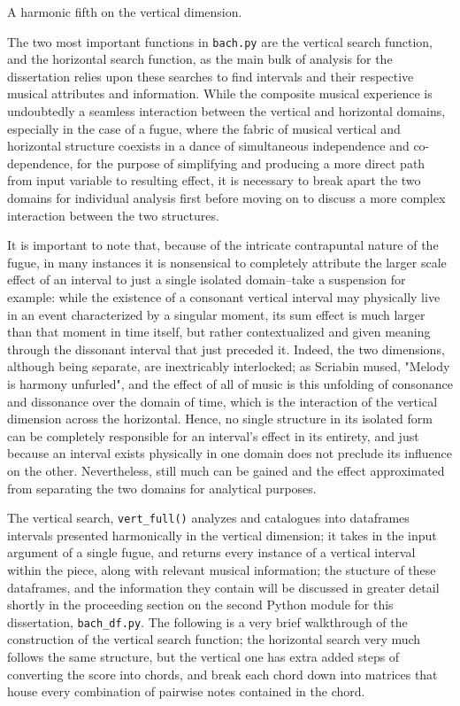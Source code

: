 \begin{Example}[H]
\vspace{1.5em}
    \centering
    \caption{ A harmonic fifth on the vertical dimension. }
\end{Example}    
    The two most important functions in \texttt{bach.py} are the vertical
search function, and the horizontal search function, as the main bulk of
analysis for the dissertation relies upon these searches to find
intervals and their respective musical attributes and information. While
the composite musical experience is undoubtedly a seamless interaction
between the vertical and horizontal domains, especially in the case of a
fugue, where the fabric of musical vertical and horizontal structure
coexists in a dance of simultaneous independence and co-dependence, for
the purpose of simplifying and producing a more direct path from input
variable to resulting effect, it is necessary to break apart the two
domains for individual analysis first before moving on to discuss a more
complex interaction between the two structures.

It is important to note that, because of the intricate contrapuntal
nature of the fugue, in many instances it is nonsensical to completely
attribute the larger scale effect of an interval to just a single
isolated domain--take a suspension for example: while the existence of
a consonant vertical interval may physically live in an event
characterized by a singular moment, its sum effect is much larger than
that moment in time itself, but rather contextualized and given meaning
through the dissonant interval that just preceded it. Indeed, the two
dimensions, although being separate, are inextricably interlocked; as
Scriabin mused, "Melody is harmony unfurled", and the effect of all of
music is this unfolding of consonance and dissonance over the domain of
time, which is the interaction of the vertical dimension across the
horizontal. Hence, no single structure in its isolated form can be
completely responsible for an interval's effect in its entirety, and
just because an interval exists physically in one domain does not
preclude its influence on the other. Nevertheless, still much can be
gained and the effect approximated from separating the two domains for
analytical purposes.

The vertical search, \texttt{vert\_full()} analyzes and catalogues into
dataframes intervals presented harmonically in the vertical dimension;
it takes in the input argument of a single fugue, and returns every
instance of a vertical interval within the piece, along with relevant
musical information; the stucture of these dataframes, and the
information they contain will be discussed in greater detail shortly in
the proceeding section on the second Python module for this
dissertation, \texttt{bach\_df.py}. The following is a very brief
walkthrough of the construction of the vertical search function; the
horizontal search very much follows the same structure, but the vertical
one has extra added steps of converting the score into chords, and break
each chord down into matrices that house every combination of pairwise
notes contained in the chord.

